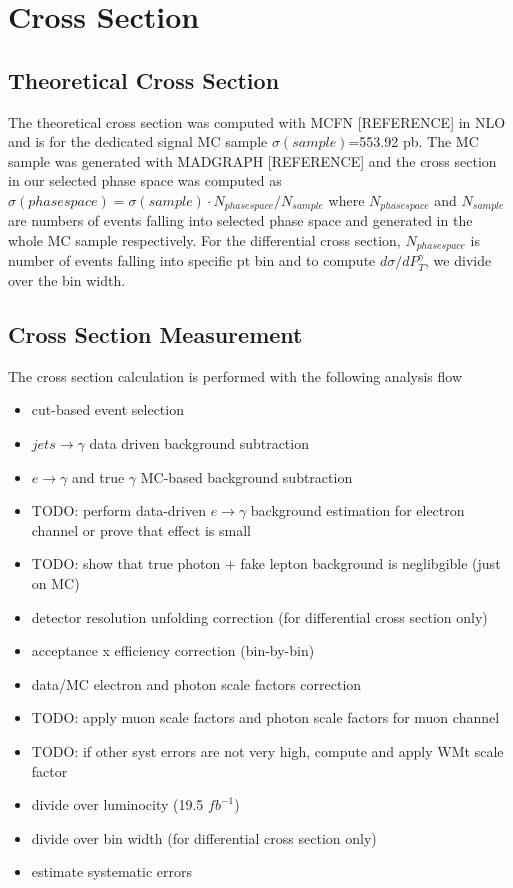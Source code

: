 \section{Cross Section}
\label{sec:CrossSection}
\subsection {Theoretical Cross Section}
The theoretical cross section was computed with MCFN [REFERENCE] in NLO and is for the dedicated signal MC sample $\sigma(sample)$=553.92 pb. The MC sample was generated with MADGRAPH [REFERENCE] and the cross section in our selected phase space was computed as $\sigma(phase space) = \sigma(sample) \cdot N_{phase space} / N_{sample}$ where  $N_{phase space}$ and $N_{sample}$ are numbers of events falling into selected phase space and generated in the whole MC sample respectively. For the differential cross section, $N_{phase space}$ is number of events falling into specific pt bin and to compute $d\sigma / dP_T^{\gamma}$, we divide over the bin width.
\subsection {Cross Section Measurement}
The cross section calculation is performed with the following analysis flow
\begin{itemize}
  \item cut-based  event selection
  \item $jets \rightarrow \gamma$ data driven background subtraction
  \item $e \rightarrow \gamma $ and true $\gamma$ MC-based background subtraction
  \item TODO: perform data-driven $e \rightarrow \gamma$ background estimation for electron channel or prove that effect is small
  \item TODO: show that true photon + fake lepton background is neglibgible (just on MC)
  \item detector resolution unfolding correction (for differential cross section only)
  \item acceptance x efficiency correction (bin-by-bin)
  \item data/MC electron and photon scale factors correction 
  \item TODO: apply muon scale factors and photon scale factors for muon channel
  \item TODO: if other syst errors are not very high, compute and apply WMt scale factor
  \item divide over luminocity (19.5 $fb^{-1}$)
  \item divide over bin width (for differential cross section only)
  \item estimate systematic errors
\end{itemize}
